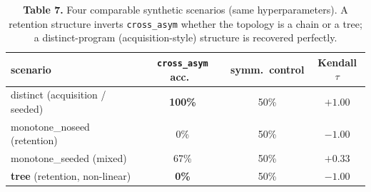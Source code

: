 \documentclass[11pt]{article}
\begin{document}
\begin{table}[h]\centering\small
\caption*{\textbf{Table 7.} Four comparable synthetic scenarios (same hyperparameters). A
retention structure inverts \texttt{cross\_asym} whether the topology is a chain or a tree;
a distinct-program (acquisition-style) structure is recovered perfectly.}
\begin{tabular}{lccc}
\toprule
scenario & \texttt{cross\_asym} acc.\ & symm.\ control & Kendall $\tau$ \\
\midrule
\rowcolor{hl}distinct (acquisition / seeded) & \textbf{100\%} & 50\% & $+1.00$ \\
monotone\_noseed (retention) & 0\% & 50\% & $-1.00$ \\
monotone\_seeded (mixed) & 67\% & 50\% & $+0.33$ \\
\rowcolor{hl}\textbf{tree} (retention, non-linear) & \textbf{0\%} & 50\% & $\mathbf{-1.00}$ \\
\bottomrule
\end{tabular}
\end{table}
\end{document}

